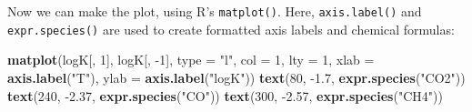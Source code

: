 \documentclass[]{tufte-book}
\newenvironment{Shaded}{}{}
\newcommand{\KeywordTok}[1]{\textcolor[rgb]{0.00,0.44,0.13}{\textbf{#1}}}
\newcommand{\DataTypeTok}[1]{\textcolor[rgb]{0.56,0.13,0.00}{#1}}
\newcommand{\DecValTok}[1]{\textcolor[rgb]{0.25,0.63,0.44}{#1}}
\newcommand{\FloatTok}[1]{\textcolor[rgb]{0.25,0.63,0.44}{#1}}
\newcommand{\StringTok}[1]{\textcolor[rgb]{0.25,0.44,0.63}{#1}}
\newcommand{\OperatorTok}[1]{\textcolor[rgb]{0.40,0.40,0.40}{#1}}
\newcommand{\NormalTok}[1]{#1}
\begin{document}
\begin{Shaded}
\end{Shaded}

Now we can make the plot, using R's \texttt{matplot()}. Here,
{\texttt{axis.label()}} and {\texttt{expr.species()}} are used to create
formatted axis labels and chemical formulas:

\begin{Shaded}
\begin{Highlighting}[]
\KeywordTok{matplot}\NormalTok{(logK[, }\DecValTok{1}\NormalTok{], logK[, }\OperatorTok{-}\DecValTok{1}\NormalTok{], }\DataTypeTok{type =} \StringTok{"l"}\NormalTok{, }\DataTypeTok{col =} \DecValTok{1}\NormalTok{, }\DataTypeTok{lty =} \DecValTok{1}\NormalTok{,}
        \DataTypeTok{xlab =} \KeywordTok{axis.label}\NormalTok{(}\StringTok{"T"}\NormalTok{), }\DataTypeTok{ylab =} \KeywordTok{axis.label}\NormalTok{(}\StringTok{"logK"}\NormalTok{))}
\KeywordTok{text}\NormalTok{(}\DecValTok{80}\NormalTok{, }\OperatorTok{-}\FloatTok{1.7}\NormalTok{, }\KeywordTok{expr.species}\NormalTok{(}\StringTok{"CO2"}\NormalTok{))}
\KeywordTok{text}\NormalTok{(}\DecValTok{240}\NormalTok{, }\OperatorTok{-}\FloatTok{2.37}\NormalTok{, }\KeywordTok{expr.species}\NormalTok{(}\StringTok{"CO"}\NormalTok{))}
\KeywordTok{text}\NormalTok{(}\DecValTok{300}\NormalTok{, }\OperatorTok{-}\FloatTok{2.57}\NormalTok{, }\KeywordTok{expr.species}\NormalTok{(}\StringTok{"CH4"}\NormalTok{))}
\end{Highlighting}
\end{Shaded}
\end{document}

